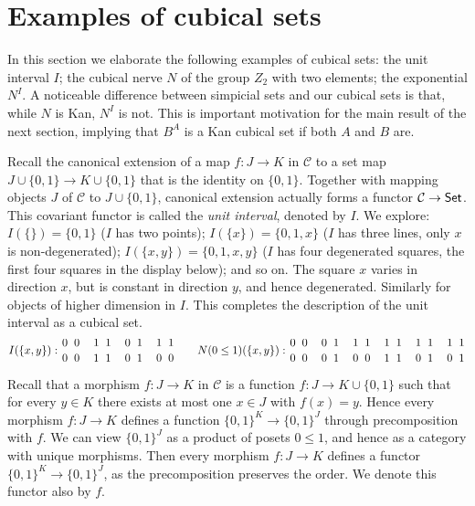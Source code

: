 \documentclass[10pt,a4paper]{article}
\newcommand{\CC}{{\mathcal C}}
\newcommand{\set}[1]{\{#1\}}
\begin{document}
\section{Examples of cubical sets}\label{sec:examples}
In this section we elaborate the following examples of cubical sets:
the unit interval $I$;
the cubical nerve $N$ of the group $Z_2$ with two elements;
the exponential $N^I$.
A noticeable difference between simpicial sets and our cubical sets is that,
while $N$ is Kan, $N^I$ is not.
This is important motivation for the main result of the next section,
implying that $B^A$ is a Kan cubical set if both $A$ and $B$ are.

Recall the canonical extension of a map $f:J\to K$ in $\CC$
to a set map $J \cup \set{0,1} \to K\cup \set{0,1}$ that is the identity on $\set{0,1}$.
Together with  mapping objects $J$ of $\CC$ to $J \cup \set{0,1}$,
canonical extension actually forms a functor $\CC\to{\sf Set}$.
This covariant functor is called the \emph{unit interval}, denoted by $I$.
We explore: $I(\set{})=\set{0,1}$ ($I$ has two points);
$I(\set{x})=\set{0,1,x}$ ($I$ has three lines, only $x$ is non-degenerated);
$I(\set{x,y})=\set{0,1,x,y}$ ($I$ has four degenerated squares,
the first four squares in the display below); and so on.
The square $x$ varies in direction $x$,
but is constant in direction $y$, and hence degenerated.
Similarly for objects of higher dimension in $I$.
This completes the description of the unit interval as a cubical set.
\[
\def\olll{{1 \atop 0} ~ {1 \atop 1}}
\def\oool{{0 \atop 0} ~ {1 \atop 0}}
\def\oooo{{0 \atop 0} ~ {0 \atop 0}}
\def\llll{{1 \atop 1} ~ {1 \atop 1}}
\def\olol{{1 \atop 0} ~ {1 \atop 0}}
\def\ooll{{0 \atop 0} ~ {1 \atop 1}}
\def\Fxy{{0 \atop 0} ~ {0 \atop 0}}
\def\Txy{{1 \atop 1} ~ {1 \atop 1}}
\def\Iy{{1 \atop 0} ~ {1 \atop 0}}
\def\Ix{{0 \atop 0} ~ {1 \atop 1}}
I(\set{x,y}):\Fxy\quad\Txy\quad\Ix\quad\Iy\quad\quad
N(0\leq1)(\set{x,y}):\oooo\quad\ooll\quad\olol\quad\llll\quad\olll\quad\olll\]

Recall that a morphism $f:J\to K$ in $\CC$ is a function $f:J\to K\cup\set{0,1}$ such that
for every $y\in K$ there exists at most one $x\in J$ with $f(x)=y$.
Hence every morphism $f:J\to K$ defines a function
$\set{0,1}^K  \to \set{0,1}^J$ through precomposition with $f$.
We can view $\set{0,1}^J$ as a product of posets $0\leq1$,
and hence as a category with unique morphisms.
Then every morphism $f:J\to K$ defines a functor
$\set{0,1}^K  \to \set{0,1}^J$, as the precomposition preserves the order.
We denote this functor also by $f$.
\end{document}
